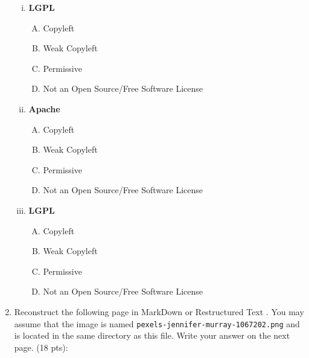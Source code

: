 \documentclass[10pt]{article}
\begin{document}
\begin{enumerate}
\begin{enumerate}[i.]
\item \textbf{LGPL}

\begin{enumerate}[A.]
	\item Copyleft
	\item Weak Copyleft
	\item Permissive
	\item Not an Open Source/Free Software License
\end{enumerate}

\item \textbf{Apache}

\begin{enumerate}[A.]
	\item Copyleft
	\item Weak Copyleft
	\item Permissive
	\item Not an Open Source/Free Software License
\end{enumerate}

\item \textbf{LGPL}

\begin{enumerate}[A.]
	\item Copyleft
	\item Weak Copyleft
	\item Permissive
	\item Not an Open Source/Free Software License
\end{enumerate}

\end{enumerate}
\fi

\newpage

    \item Reconstruct the following page in MarkDown or Restructured Text . You may assume that the image is named \verb*|pexels-jennifer-murray-1067202.png| and is located in the same directory as this file. Write your answer on the next page. (18 pts):
    

\end{enumerate}
\end{document}
